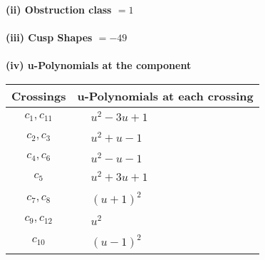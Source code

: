 \documentclass[1p]{elsarticle_modified}
\theoremstyle{definition}
\begin{document}
\flushleft \textbf{(ii) Obstruction class $= 1$}\\~\\
\flushleft \textbf{(iii) Cusp Shapes $= -49$}\\~\\
\newpage\renewcommand{\arraystretch}{1}
\flushleft \textbf{(iv) u-Polynomials at the component}\newline \\
\begin{tabular}{m{50pt}|m{274pt}}
Crossings & \hspace{64pt}u-Polynomials at each crossing \\
\hline $$\begin{aligned}c_{1},c_{11}\end{aligned}$$&$\begin{aligned}
&u^2-3 u+1
\end{aligned}$\\
\hline $$\begin{aligned}c_{2},c_{3}\end{aligned}$$&$\begin{aligned}
&u^2+u-1
\end{aligned}$\\
\hline $$\begin{aligned}c_{4},c_{6}\end{aligned}$$&$\begin{aligned}
&u^2- u-1
\end{aligned}$\\
\hline $$\begin{aligned}c_{5}\end{aligned}$$&$\begin{aligned}
&u^2+3 u+1
\end{aligned}$\\
\hline $$\begin{aligned}c_{7},c_{8}\end{aligned}$$&$\begin{aligned}
&(u+1)^2
\end{aligned}$\\
\hline $$\begin{aligned}c_{9},c_{12}\end{aligned}$$&$\begin{aligned}
&u^2
\end{aligned}$\\
\hline $$\begin{aligned}c_{10}\end{aligned}$$&$\begin{aligned}
&(u-1)^2
\end{aligned}$\\
\hline
\end{tabular}\\~\\
\end{document}
